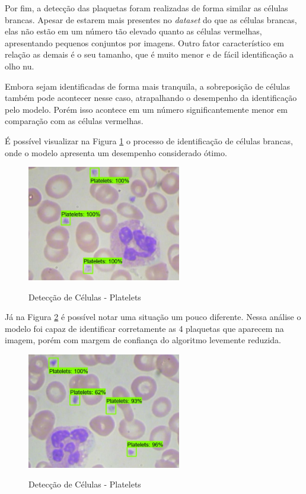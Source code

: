 Por fim, a detecção das plaquetas foram realizadas de forma similar as células brancas. Apesar de estarem mais presentes no \emph{dataset} do que as células brancas, elas não estão em um número tão elevado quanto as células vermelhas, apresentando pequenos conjuntos por imagens. Outro fator característico em relação as demais é o seu tamanho, que é muito menor e de fácil identificação a olho nu.

Embora sejam identificadas de forma mais tranquila, a sobreposição de células também pode acontecer nesse caso, atrapalhando o desempenho da identificação pelo modelo. Porém isso acontece em um número significantemente menor em comparação com as células vermelhas.

É possível visualizar na Figura \ref{fig:predict_platelets} o processo de identificação de células brancas, onde o modelo apresenta um desempenho considerado ótimo.

\begin{figure}[!htb]
	\centering
	\caption{Detecção de Células - Platelets}
	\includegraphics[width=0.60\textwidth]{img/predict_platelets.jpeg}
	\label{fig:predict_platelets}
\end{figure}

Já na Figura \ref{fig:predict_platelets_2} é possível notar uma situação um pouco diferente. Nessa análise o modelo foi capaz de identificar corretamente as 4 plaquetas que aparecem na imagem, porém com margem de confiança do algoritmo levemente reduzida. 

\begin{figure}[!htb]
	\centering
	\caption{Detecção de Células - Platelets}
	\includegraphics[width=0.60\textwidth]{img/predict_platelets_2.jpeg}
	\label{fig:predict_platelets_2}
\end{figure}

